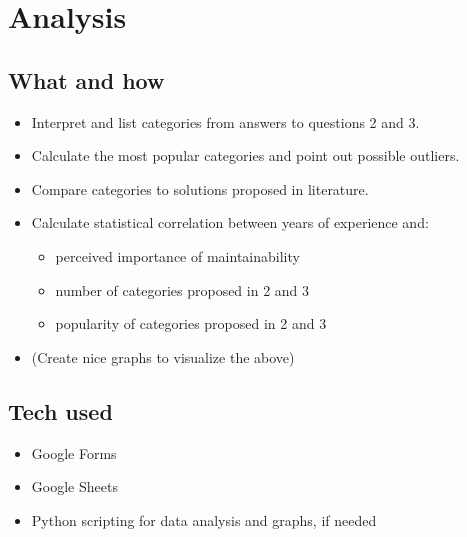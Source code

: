 \documentclass[utf8,english]{gradu3}
\begin{document}
\chapter{Analysis}

\section{What and how}
\begin{itemize}
  \item Interpret and list categories from answers to questions 2 and 3.
  \item Calculate the most popular categories and point out possible outliers.
  \item Compare categories to solutions proposed in literature.
  \item Calculate statistical correlation between years of experience and:
        \begin{itemize}
          \item perceived importance of maintainability
          \item number of categories proposed in 2 and 3
          \item popularity of categories proposed in 2 and 3
        \end{itemize}
  \item (Create nice graphs to visualize the above)
\end{itemize}

\section{Tech used}
\begin{itemize}
  \item Google Forms
  \item Google Sheets
  \item Python scripting for data analysis and graphs, if needed
\end{itemize}


\printbibliography
\end{document}
